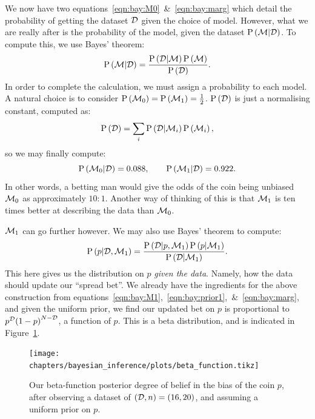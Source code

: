 We now have two equations~\eqref{eqn:bay:M0}~\&~\eqref{eqn:bay:marg} which detail the probability of getting the dataset $\mathcal{D}$ given the choice of model. However, what we are really after is the probability of the model, given the dataset $\mathrm{P}\left(\mathcal{M}\middle|\mathcal{D}\right)$. To compute this, we use Bayes' theorem:
\begin{equation}
  \mathrm{P}\left(\mathcal{M}\middle|\mathcal{D}\right) = \frac{\mathrm{P}\left(\mathcal{D}\middle|\mathcal{M}\right)\mathrm{P}\left(\mathcal{M}\right)}{\mathrm{P}\left(\mathcal{D}\right)}.
  \label{eqn:bay:bay_md}
\end{equation}
In order to complete the calculation, we must assign a probability to each model. A natural choice is to consider $\mathrm{P}\left(\mathcal{M}_0\right)=\mathrm{P}\left(\mathcal{M}_1\right)=\frac{1}{2}$. $\mathrm{P}\left(\mathcal{D}\right)$ is just a normalising constant, computed as:
\begin{equation}
  \mathrm{P}\left(\mathcal{D}\right) = \sum_i \mathrm{P}\left(\mathcal{D}\middle|\mathcal{M}_i\right)\mathrm{P}\left(\mathcal{M}_i\right), 
  \label{eqn:bay:norm}
\end{equation}
so we may finally compute:
\begin{equation}
  \mathrm{P}\left(\mathcal{M}_0\middle|\mathcal{D}\right) = 0.088, \qquad
  \mathrm{P}\left(\mathcal{M}_1\middle|\mathcal{D}\right) = 0.922.
  \label{eqn:bay:comp}
\end{equation}
In other words, a betting man would give the odds of the coin being unbiased $\mathcal{M}_0$ as approximately $10:1$. Another way of thinking of this is that $\mathcal{M}_1$ is ten times better at describing the data than $\mathcal{M}_0$.

$\mathcal{M}_1$ can go further however. We may also use Bayes' theorem to compute:
\begin{equation}
  \mathrm{P}\left(p\middle|\mathcal{D},\mathcal{M}_1\right) = \frac{\mathrm{P}\left(\mathcal{D}\middle|p,\mathcal{M}_1\right)\mathrm{P}\left(p\middle|\mathcal{M}_1\right)}{\mathrm{P}\left(\mathcal{D}\middle|\mathcal{M}_1\right)}.
  \label{eqn:bay:bay_p}
\end{equation}
This here gives us the distribution on $p$ {\em given the data}. Namely, how the data should update our ``spread bet''. We already have the ingredients for the above construction from equations~\eqref{eqn:bay:M1},~\eqref{eqn:bay:prior1},~\&~\eqref{eqn:bay:marg}, and given the uniform prior, we find our updated bet on $p$ is proportional to $p^{\mathcal{D}}{(1-p)}^{N-\mathcal{D}}$, a function of $p$. This is a beta distribution, and is indicated in Figure~\ref{fig:bay:beta}.

\begin{figure}[tp]
  \centering
  \texttt{[image: chapters/bayesian\_inference/plots/beta\_function.tikz]}
  \caption{%
  Our beta-function posterior degree of belief in the bias of the coin $p$, after observing a dataset of $(\mathcal{D},n)=(16,20)$, and assuming a uniform prior on $p$.\label{fig:bay:beta}
}
\end{figure}

